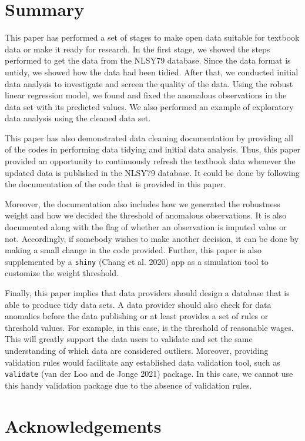 \documentclass{article}
\begin{document}
\hypertarget{summary}{%
\section{Summary}\label{summary}}

This paper has performed a set of stages to make open data suitable for textbook data or make it ready for research. In the first stage, we showed the steps performed to get the data from the NLSY79 database. Since the data format is untidy, we showed how the data had been tidied. After that, we conducted initial data analysis to investigate and screen the quality of the data. Using the robust linear regression model, we found and fixed the anomalous observations in the data set with its predicted values. We also performed an example of exploratory data analysis using the cleaned data set.

This paper has also demonstrated data cleaning documentation by providing all of the codes in performing data tidying and initial data analysis. Thus, this paper provided an opportunity to continuously refresh the textbook data whenever the updated data is published in the NLSY79 database. It could be done by following the documentation of the code that is provided in this paper.

Moreover, the documentation also includes how we generated the robustness weight and how we decided the threshold of anomalous observations. It is also documented along with the flag of whether an observation is imputed value or not. Accordingly, if somebody wishes to make another decision, it can be done by making a small change in the code provided. Further, this paper is also supplemented by a \texttt{shiny} (Chang et al. 2020) app as a simulation tool to customize the weight threshold.

Finally, this paper implies that data providers should design a database that is able to produce tidy data sets. A data provider should also check for data anomalies before the data publishing or at least provides a set of rules or threshold values. For example, in this case, is the threshold of reasonable wages. This will greatly support the data users to validate and set the same understanding of which data are considered outliers. Moreover, providing validation rules would facilitate any established data validation tool, such as \texttt{validate} (van der Loo and de Jonge 2021) package. In this case, we cannot use this handy validation package due to the absence of validation rules.

\hypertarget{acknowledgements}{%
\section{Acknowledgements}\label{acknowledgements}}
\end{document}
